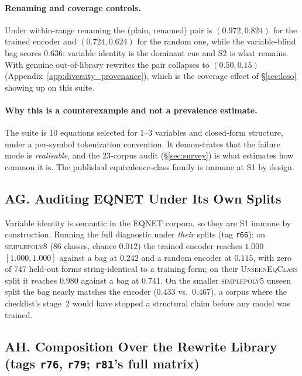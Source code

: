 \paragraph{Renaming and coverage controls.} Under within-range renaming the (plain, renamed) pair is $(0.972, 0.824)$ for the trained encoder and $(0.724, 0.624)$ for the random one, while the variable-blind bag scores $0.636$: variable identity is the dominant cue and S2 is what remains. With genuine out-of-library rewrites the pair collapses to $(0.50, 0.15)$ (Appendix~\ref{app:diversity_provenance}), which is the coverage effect of \S\ref{sec:loso} showing up on this suite.

\paragraph{Why this is a counterexample and not a prevalence estimate.} The suite is 10 equations selected for 1--3 variables and closed-form structure, under a per-symbol tokenization convention. It demonstrates that the failure mode is \emph{realisable}, and the 23-corpus audit (\S\ref{sec:survey}) is what estimates how common it is. The published equivalence-class family is immune at S1 by design.

\subsection*{AG. Auditing EQNET Under Its Own Splits}

Variable identity is semantic in the EQNET corpora, so they are S1 immune by construction. Running the full diagnostic under \emph{their} splits (tag \texttt{r66}): on \textsc{simplepoly8} (86 classes, chance $0.012$) the trained encoder reaches $1.000$ $[1.000, 1.000]$ against a bag at $0.242$ and a random encoder at $0.115$, with zero of 747 held-out forms string-identical to a training form; on their \textsc{UnseenEqClass} split it reaches $0.980$ against a bag at $0.741$. On the smaller \textsc{simplepoly5} unseen split the bag nearly matches the encoder ($0.433$ vs.\ $0.467$), a corpus where the checklist's stage~2 would have stopped a structural claim before any model was trained.

\subsection*{AH. Composition Over the Rewrite Library (tags \texttt{r76}, \texttt{r79}; \texttt{r81}'s full matrix)}

